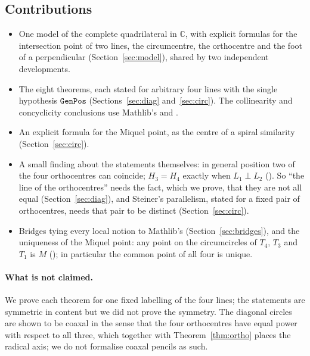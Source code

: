 \documentclass[11pt]{article}
\theoremstyle{definition}
\theoremstyle{remark}
\newcommand{\lean}[1]{\texttt{#1}}
\newcommand{\CC}{\mathbb{C}}
\begin{document}
\subsection{Contributions}
\begin{itemize}
\item One model of the complete quadrilateral in $\CC$, with explicit formulas for the intersection
point of two lines, the circumcentre, the orthocentre and the foot of a perpendicular
(Section~\ref{sec:model}), shared by two independent developments.
\item The eight theorems, each stated for arbitrary four lines with the single hypothesis
$\lean{GenPos}$ (Sections~\ref{sec:diag} and~\ref{sec:circ}). The collinearity and concyclicity
conclusions use Mathlib's  and .
\item An explicit formula for the Miquel point, as the centre of a spiral similarity
(Section~\ref{sec:circ}).
\item A small finding about the statements themselves: in general position two of the four
orthocentres can coincide; $H_3=H_4$ exactly when $L_1\perp L_2$ ().
So ``the line of the orthocentres'' needs the fact, which we prove, that they are not all equal
(Section~\ref{sec:diag}), and Steiner's parallelism, stated for a fixed pair of orthocentres, needs
that pair to be distinct (Section~\ref{sec:circ}).
\item Bridges tying every local notion to Mathlib's (Section~\ref{sec:bridges}), and the uniqueness of
the Miquel point: any point on the circumcircles of $T_4$, $T_3$ and $T_1$ is $M$
(); in particular the common point of all four is unique.
\end{itemize}

\paragraph{What is not claimed.} We prove each theorem for one fixed labelling of the four lines; the
statements are symmetric in content but we did not prove the symmetry. The diagonal circles are shown
to be coaxal in the sense that the four orthocentres have equal power with respect to all three, which
together with Theorem~\ref{thm:ortho} places the radical axis; we do not formalise coaxal pencils as
such.
\end{document}

